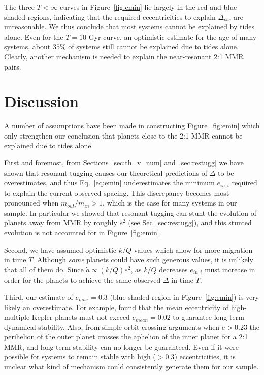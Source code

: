 The three $T < \infty$ curves in Figure~\ref{fig:emin} lie largely in the red and blue shaded regions, indicating that the required eccentricities to explain $\Delta_{obs}$ are unreasonable. 
We thus conclude that most \kep{} systems cannot be explained by tides alone.
Even for the $T=10$ Gyr curve, an optimistic estimate for the age of many \kep{} systems, about $35\%$ of systems still cannot be explained due to tides alone. 
Clearly, another mechanism is needed to explain the near-resonant 2:1 MMR pairs.

\section{Discussion}
\label{sec:Discussion}
A number of assumptions have been made in constructing Figure~\ref{fig:emin} which only strengthen our conclusion that planets close to the 2:1 MMR cannot be explained due to tides alone. 

First and foremost, from Sections~\ref{sec:th_v_num} and~\ref{sec:restugg} we have shown that resonant tugging causes our theoretical predictions of $\Delta$ to be overestimates, and thus Eq.~\ref{eq:emin} underestimates the minimum $e_{in,i}$ required to explain the current observed spacing. 
This discrepancy becomes most pronounced when $m_{out}/m_{in} > 1$, which is the case for many \kep{} systems in our sample.
In particular we showed that resonant tugging can stunt the evolution of planets away from MMR by roughly $e^2$ (see Sec~\ref{sec:restugg}), and this stunted evolution is not accounted for in Figure~\ref{fig:emin}.  

Second, we have assumed optimistic $k/Q$ values which allow for more migration in time $T$. 
Although \textit{some} planets could have such generous values, it is unlikely that all of them do. 
Since $\dot{a} \propto (k/Q)e^2$, as $k/Q$ decreases $e_{in,i}$ must increase in order for the planets to achieve the same observed $\Delta$ in time $T$.

Third, our estimate of $e_{max} = 0.3$ (blue-shaded region in Figure~\ref{fig:emin}) is very likely an overestimate. 
For example, \cite{Pu2015} found that the mean eccentricity of high-multiple Kepler planets must not exceed $e_{mean} = 0.02$ to guarantee long-term dynamical stability. 
Also, from simple orbit crossing arguments when $e > 0.23$ the perihelion of the outer planet crosses the aphelion of the inner planet for a 2:1 MMR, and long-term stability can no longer be guaranteed.
Even if it were possible for \kep{} systems to remain stable with high ($> 0.3$) eccentricities, it is unclear what kind of mechanism could consistently generate them for our \kep{} sample.

